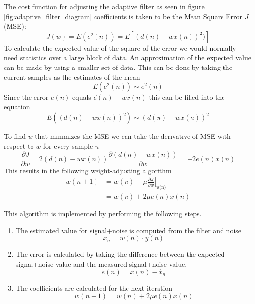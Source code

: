The cost function for adjusting the adaptive filter as seen in figure \ref{fig:adaptive_filter_diagram} coefficients is taken to be the Mean Square Error $J$ (MSE):
\begin{equation}
    J(w) = E(e^2(n)) = E[(d(n) - wx(n))^2)]
\end{equation}
To calculate the expected value of the square of the error we would normally need statistics over a large block of data. An approximation of the expected value can be made by using a smaller set of data. This can be done by taking the current samples as the estimates of the mean
\begin{equation}
    E(e^2(n)) \sim e^2(n)
\end{equation}
Since the error $e(n)$ equals $d(n) - wx(n)$ this can be filled into the equation
\begin{equation}
    E \left( \left(d(n) - wx(n)\right)^2 \right) \sim \left(d(n) - wx(n)\right)^2
\end{equation}

To find $w$ that minimizes the MSE we can take the derivative of MSE with respect to $w$ for every sample $n$
\begin{equation}
    \frac{\partial J}{\partial w} = 2\left(d(n) - wx(n)\right) \frac{\partial\left(d(n) - wx(n)\right)}{\partial w} = -2e(n)x(n)
\end{equation}
This results in the following weight-adjusting algorithm
\begin{align}
    w(n+1) &=\left.w(n)-\mu \frac{\partial J}{\partial w}\right\rvert_\text{w(n)} \\
    &= w(n) + 2 \mu e(n)x(n)
\end{align}


This algorithm is implemented by performing the following steps. \\
\begin{enumerate}
    \item The estimated value for signal+noise is computed from the filter and noise
    \begin{equation}\label{eq:adaptive1}
        \hat{x}_n = w(n)\cdot y(n)
    \end{equation}
        \item The error is calculated by taking the difference between the expected signal+noise value and the measured signal+noise value.
    \begin{equation}\label{eq:adaptive2}
        e(n) = x(n) - \hat{x}_n
    \end{equation}
    \item The coefficients are calculated for the next iteration
    \begin{equation}\label{eq:adaptive3}
        w(n+1) = w(n) + 2 \mu e(n) x(n)
    \end{equation}
\end{enumerate}


